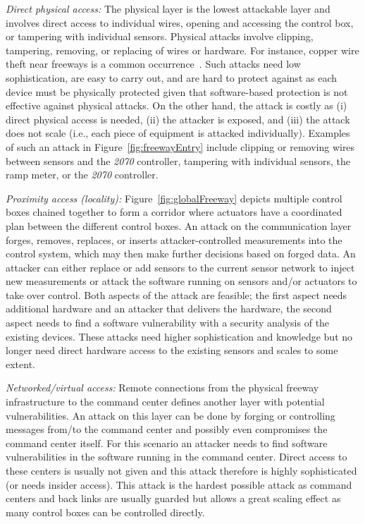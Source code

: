     \emph{Direct physical access:}
    The physical layer is the lowest attackable layer and involves direct access to
    individual wires, opening and accessing the control box, or tampering with
    individual sensors. Physical attacks involve clipping, tampering, removing, or
    replacing of wires or hardware. For instance, copper wire theft near freeways is a common occurrence~\cite{Sutton2014Custom,Rosenberg2014Custom}. Such attacks need low sophistication, are
    easy to carry out, and are hard to protect against as each device must be physically
    protected given that software-based protection is not effective against physical
    attacks. On the other hand, the attack is costly as (i) direct physical access
    is needed, (ii) the attacker is exposed, and (iii) the attack does not scale
    (i.e., each piece of equipment is attacked individually). Examples of such an
    attack in Figure~\ref{fig:freewayEntry} include clipping or removing wires
    between sensors and the \emph{2070} controller, tampering with individual sensors, the
    ramp meter, or the \emph{2070} controller.

\emph{Proximity access (locality):}
Figure~\ref{fig:globalFreeway} depicts multiple control boxes chained together to form a corridor
where actuators have a coordinated plan between the different control
boxes. An attack on the communication layer forges, removes, replaces, or
inserts attacker-controlled measurements into the control system, which may then make further decisions based on forged data. An attacker can either replace or add sensors to
the current sensor network to inject new measurements or attack the software
running on sensors and/or actuators to take over control. Both aspects of the
attack are feasible; the first aspect needs additional hardware and an attacker
that delivers the hardware, the second aspect needs to find a software
vulnerability with a security analysis of the existing devices. These attacks
need higher sophistication and knowledge but no longer need direct hardware
access to the existing sensors and scales to some extent.

\emph{Networked/virtual access:}
Remote connections from the physical freeway infrastructure to the command center defines another layer with potential vulnerabilities. An attack on this layer can be done by forging or controlling messages from/to the command center and
possibly even compromises the command center itself. For this scenario an
attacker needs to find software vulnerabilities in the software running in the
command center. Direct access to these centers is usually not given and this
attack therefore is highly sophisticated (or needs insider access). This attack
is the hardest possible attack as command centers and back links are usually
guarded but allows a great scaling effect as many control boxes can be
controlled directly.

